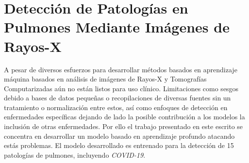 \section{Detección de Patologías en Pulmones Mediante Imágenes de Rayos-X}

A pesar de diversos esfuerzos para desarrollar métodos basados en aprendizaje máquina basados en
análisis de imágenes de Rayos-X y Tomografías Computarizadas aún no están listos para uso clínico.
Limitaciones como sesgos debido a bases de datos pequeñas o recopilaciones de diversas fuentes sin
un tratamiento o normalización entre estos, así como enfoques de detección en enfermedades
específicas dejando de lado la posible contribución a los modelos la inclusión de otras enfermedades.
Por ello el trabajo presentado en este escrito se concentra en desarrollar un modelo basado en
aprendizaje profundo atacando estás problemas. El modelo desarrollado es entrenado para la detección
de 15 patologías de pulmones, incluyendo \textit{COVID-19}.

